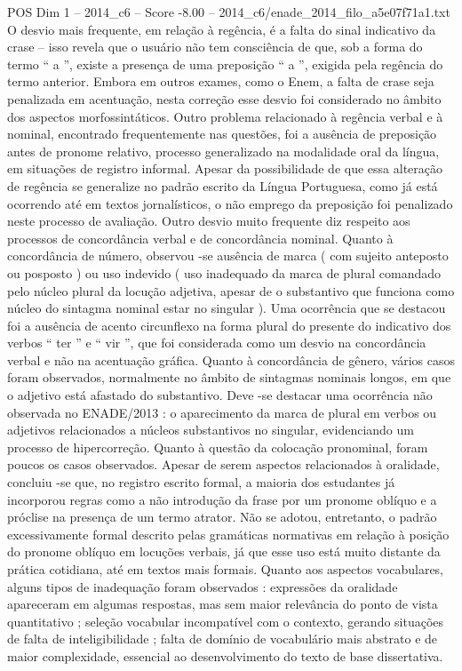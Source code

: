 \begin{textsample}{POS Dim 1 – 2014\_c6 – Score -8.00 – 2014\_c6/enade\_2014\_filo\_a5e07f71a1.txt}
O desvio mais frequente, em relação à regência, é a falta do sinal indicativo da crase – isso revela que o usuário não tem consciência de que, sob a forma do termo “ a ”, existe a presença de uma preposição “ a ”, exigida pela regência do termo anterior.
Embora em outros exames, como o Enem, a falta de crase seja penalizada em acentuação, nesta correção esse desvio foi considerado no âmbito dos aspectos morfossintáticos.
Outro problema relacionado à regência verbal e à nominal, encontrado frequentemente nas questões, foi a ausência de preposição antes de pronome relativo, processo generalizado na modalidade oral da língua, em situações de registro informal.
Apesar da possibilidade de que essa alteração de regência se generalize no padrão escrito da Língua Portuguesa, como já está ocorrendo até em textos jornalísticos, o não emprego da preposição foi penalizado neste processo de avaliação.
Outro desvio muito frequente diz respeito aos processos de concordância verbal e de concordância nominal.
Quanto à concordância de número, observou -se ausência de marca ( com sujeito anteposto ou posposto ) ou uso indevido ( uso inadequado da marca de plural comandado pelo núcleo plural da locução adjetiva, apesar de o substantivo que funciona como núcleo do sintagma nominal estar no singular ).
Uma ocorrência que se destacou foi a ausência de acento circunflexo na forma plural do presente do indicativo dos verbos “ ter ” e “ vir ”, que foi considerada como um desvio na concordância verbal e não na acentuação gráfica.
Quanto à concordância de gênero, vários casos foram observados, normalmente no âmbito de sintagmas nominais longos, em que o adjetivo está afastado do substantivo.
Deve -se destacar uma ocorrência não observada no ENADE/2013 : o aparecimento da marca de plural em verbos ou adjetivos relacionados a núcleos substantivos no singular, evidenciando um processo de hipercorreção.
Quanto à questão da colocação pronominal, foram poucos os casos observados.
Apesar de serem aspectos relacionados à oralidade, concluiu -se que, no registro escrito formal, a maioria dos estudantes já incorporou regras como a não introdução da frase por um pronome oblíquo e a próclise na presença de um termo atrator.
Não se adotou, entretanto, o padrão excessivamente formal descrito pelas gramáticas normativas em relação à posição do pronome oblíquo em locuções verbais, já que esse uso está muito distante da prática cotidiana, até em textos mais formais.
Quanto aos aspectos vocabulares, alguns tipos de inadequação foram observados : expressões da oralidade apareceram em algumas respostas, mas sem maior relevância do ponto de vista quantitativo ; seleção vocabular incompatível com o contexto, gerando situações de falta de inteligibilidade ; falta de domínio de vocabulário mais abstrato e de maior complexidade, essencial ao desenvolvimento do texto de base dissertativa.

\end{textsample}
